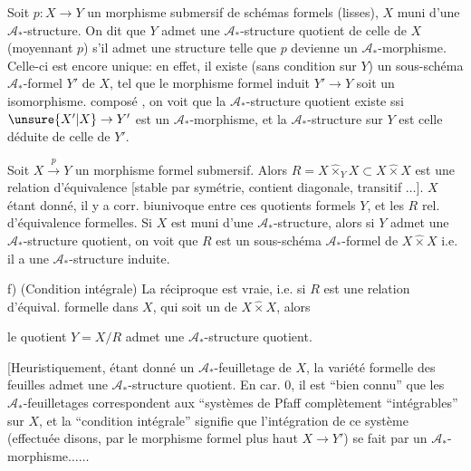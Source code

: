 Soit $p:X\to Y$ un morphisme submersif de schémas formels (lisses),  $X$ muni d'une $\mathcal A_*$-structure. On dit que $Y$ admet une $\mathcal A_*$-structure quotient de celle de $X$ (moyennant $p$) s'il admet une  structure telle que $p$ devienne un $\mathcal A_*$-morphisme. Celle-ci est encore unique: en effet, il existe (sans condition sur $Y$) un  sous-schéma $\mathcal A_*$-formel $Y'$ de $X$, tel que le morphisme formel induit $Y'\to Y$ soit un isomorphisme.   composé
, on voit  que la $\mathcal A_*$-structure quotient existe ssi $\unsure{X'|X}\to Y'$ est un $\mathcal A_*$-morphisme, et la $\mathcal A_*$-structure sur $Y$ est celle déduite de celle de $Y'$.

 Soit $X\xrightarrow{p}Y$ un morphisme formel submersif. Alors $R=X\mathbin{\hat\times}_Y X\subset X\mathbin{\hat\times}X$ est une  relation d'équivalence [stable par symétrie, contient diagonale, transitif $\ldots$].   $X$ étant donné, il y a corr. biunivoque entre ces quotients formels $Y$, et les $R$ rel. d'équivalence formelles. Si $X$ est muni d'une $\mathcal A_*$-structure, alors si $Y$ admet une $\mathcal A_*$-structure quotient, on voit que $R$ est un sous-schéma $\mathcal A_*$-formel de $X\mathbin{\hat\times}X$ i.e. il a une $\mathcal A_*$-structure induite.

f) (Condition intégrale) La réciproque est vraie, i.e. si $R$ est une relation d'équival. formelle dans $X$, qui soit un  de $X\mathbin{\hat\times}X$, alors

le quotient  $Y=X/R$ admet une $\mathcal A_*$-structure quotient.

[Heuristiquement, étant donné un $\mathcal A_*$-feuilletage de $X$, la variété formelle des feuilles admet une $\mathcal A_*$-structure quotient. En car. 0, il est ``bien connu'' que les $\mathcal A_*$-feuilletages correspondent aux ``systèmes de Pfaff complètement ``intégrables'' sur $X$, et la ``condition intégrale'' signifie que l'intégration de ce système (effectuée disons, par le morphisme formel plus haut $X\to Y'$) se fait par un $\mathcal A_*$-morphisme$\ldots\ldots$

